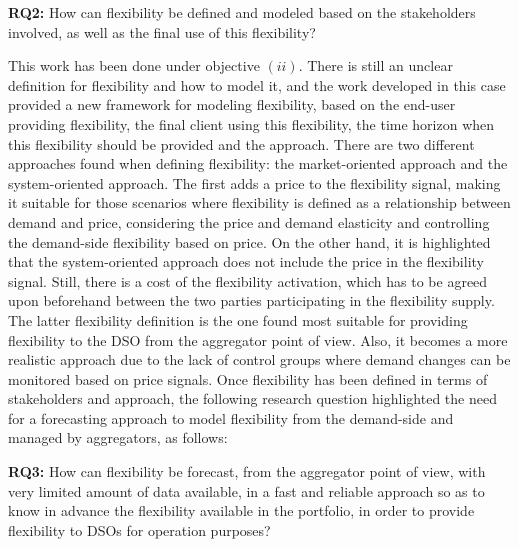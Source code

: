 \begin{tcolorbox}

\textbf{RQ2:} How can flexibility be defined and modeled based on the stakeholders involved, as well as the final use of this flexibility?

\end{tcolorbox}

This work has been done under objective $(ii)$. There is still an unclear definition for flexibility and how to model it, and the work developed in this case provided a new framework for modeling flexibility, based on the end-user providing flexibility, the final client using this flexibility, the time horizon when this flexibility should be provided and the approach. There are two different approaches found when defining flexibility: the market-oriented approach and the system-oriented approach. The first adds a price to the flexibility signal, making it suitable for those scenarios where flexibility is defined as a relationship between demand and price, considering the price and demand elasticity and controlling the demand-side flexibility based on price. On the other hand, it is highlighted that the system-oriented approach does not include the price in the flexibility signal. Still, there is a cost of the flexibility activation, which has to be agreed upon beforehand between the two parties participating in the flexibility supply. The latter flexibility definition is the one found most suitable for providing flexibility to the DSO from the aggregator point of view. Also, it becomes a more realistic approach due to the lack of control groups where demand changes can be monitored based on price signals. Once flexibility has been defined in terms of stakeholders and approach, the following research question highlighted the need for a forecasting approach to model flexibility from the demand-side and managed by aggregators, as follows:

\begin{tcolorbox}
\textbf{RQ3:} How can flexibility be forecast, from the aggregator point of view, with very limited amount of data available, in a fast and reliable approach so as to know in advance the flexibility available in the portfolio, in order to provide flexibility to DSOs for operation purposes?
\end{tcolorbox}

